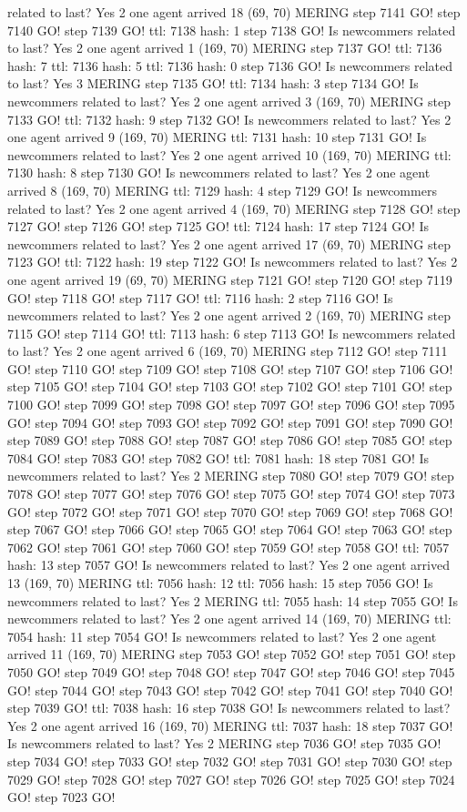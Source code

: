 related to last? Yes 2 one agent arrived 18 (69, 70) MERING step 7141 GO! step 7140 GO! step 7139 GO! ttl: 7138 hash: 1 step 7138 GO! Is newcommers related to last? Yes 2 one agent arrived 1 (169, 70) MERING step 7137 GO! ttl: 7136 hash: 7 ttl: 7136 hash: 5 ttl: 7136 hash: 0 step 7136 GO! Is newcommers related to last? Yes 3 MERING step 7135 GO! ttl: 7134 hash: 3 step 7134 GO! Is newcommers related to last? Yes 2 one agent arrived 3 (169, 70) MERING step 7133 GO! ttl: 7132 hash: 9 step 7132 GO! Is newcommers related to last? Yes 2 one agent arrived 9 (169, 70) MERING ttl: 7131 hash: 10 step 7131 GO! Is newcommers related to last? Yes 2 one agent arrived 10 (169, 70) MERING ttl: 7130 hash: 8 step 7130 GO! Is newcommers related to last? Yes 2 one agent arrived 8 (169, 70) MERING ttl: 7129 hash: 4 step 7129 GO! Is newcommers related to last? Yes 2 one agent arrived 4 (169, 70) MERING step 7128 GO! step 7127 GO! step 7126 GO! step 7125 GO! ttl: 7124 hash: 17 step 7124 GO! Is newcommers related to last? Yes 2 one agent arrived 17 (69, 70) MERING step 7123 GO! ttl: 7122 hash: 19 step 7122 GO! Is newcommers related to last? Yes 2 one agent arrived 19 (69, 70) MERING step 7121 GO! step 7120 GO! step 7119 GO! step 7118 GO! step 7117 GO! ttl: 7116 hash: 2 step 7116 GO! Is newcommers related to last? Yes 2 one agent arrived 2 (169, 70) MERING step 7115 GO! step 7114 GO! ttl: 7113 hash: 6 step 7113 GO! Is newcommers related to last? Yes 2 one agent arrived 6 (169, 70) MERING step 7112 GO! step 7111 GO! step 7110 GO! step 7109 GO! step 7108 GO! step 7107 GO! step 7106 GO! step 7105 GO! step 7104 GO! step 7103 GO! step 7102 GO! step 7101 GO! step 7100 GO! step 7099 GO! step 7098 GO! step 7097 GO! step 7096 GO! step 7095 GO! step 7094 GO! step 7093 GO! step 7092 GO! step 7091 GO! step 7090 GO! step 7089 GO! step 7088 GO! step 7087 GO! step 7086 GO! step 7085 GO! step 7084 GO! step 7083 GO! step 7082 GO! ttl: 7081 hash: 18 step 7081 GO! Is newcommers related to last? Yes 2 MERING step 7080 GO! step 7079 GO! step 7078 GO! step 7077 GO! step 7076 GO! step 7075 GO! step 7074 GO! step 7073 GO! step 7072 GO! step 7071 GO! step 7070 GO! step 7069 GO! step 7068 GO! step 7067 GO! step 7066 GO! step 7065 GO! step 7064 GO! step 7063 GO! step 7062 GO! step 7061 GO! step 7060 GO! step 7059 GO! step 7058 GO! ttl: 7057 hash: 13 step 7057 GO! Is newcommers related to last? Yes 2 one agent arrived 13 (169, 70) MERING ttl: 7056 hash: 12 ttl: 7056 hash: 15 step 7056 GO! Is newcommers related to last? Yes 2 MERING ttl: 7055 hash: 14 step 7055 GO! Is newcommers related to last? Yes 2 one agent arrived 14 (169, 70) MERING ttl: 7054 hash: 11 step 7054 GO! Is newcommers related to last? Yes 2 one agent arrived 11 (169, 70) MERING step 7053 GO! step 7052 GO! step 7051 GO! step 7050 GO! step 7049 GO! step 7048 GO! step 7047 GO! step 7046 GO! step 7045 GO! step 7044 GO! step 7043 GO! step 7042 GO! step 7041 GO! step 7040 GO! step 7039 GO! ttl: 7038 hash: 16 step 7038 GO! Is newcommers related to last? Yes 2 one agent arrived 16 (169, 70) MERING ttl: 7037 hash: 18 step 7037 GO! Is newcommers related to last? Yes 2 MERING step 7036 GO! step 7035 GO! step 7034 GO! step 7033 GO! step 7032 GO! step 7031 GO! step 7030 GO! step 7029 GO! step 7028 GO! step 7027 GO! step 7026 GO! step 7025 GO! step 7024 GO! step 7023 GO! 